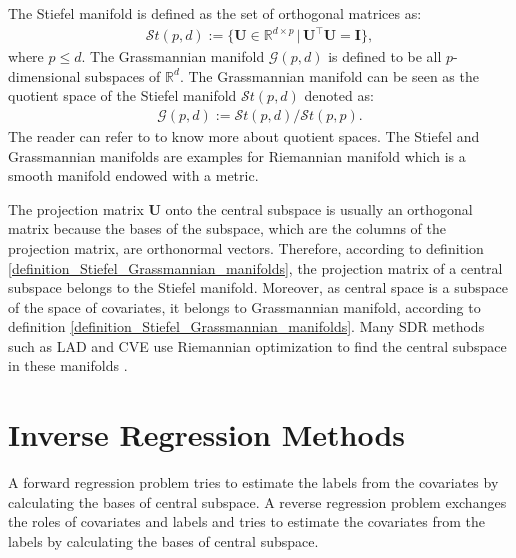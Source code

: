 \documentclass[lang=cn,10pt]{gorgeousnbook}
\numberwithin{equation}{section}%
\numberwithin{figure}{section}%
\begin{document}
\begin{definition}\label{definition_Stiefel_Grassmannian_manifolds}
The Stiefel manifold is defined as the set of orthogonal matrices as:
\begin{align}
\mathcal{S}t(p,d) := \{\boldsymbol{U} \in \mathbb{R}^{d \times p}\, |\, \boldsymbol{U}^\top \boldsymbol{U} = \boldsymbol{I}\},
\end{align}
where $p \leq d$.
The Grassmannian manifold $\mathcal{G}(p,d)$ is defined to be all $p$-dimensional subspaces of $\mathbb{R}^d$. The Grassmannian manifold can be seen as the quotient space of the Stiefel manifold $\mathcal{S}t(p,d)$ denoted as:
\begin{align}
\mathcal{G}(p,d) := \mathcal{S}t(p,d) / \mathcal{S}t(p,p).
\end{align}
The reader can refer to \cite{absil2009optimization} to know more about quotient spaces. 
The Stiefel and Grassmannian manifolds are examples for Riemannian manifold which is a smooth manifold endowed with a metric. 
\end{definition}
The projection matrix $\boldsymbol{U}$ onto the central subspace is usually an orthogonal matrix because the bases of the subspace, which are the columns of the projection matrix, are orthonormal vectors. 
Therefore, according to definition \ref{definition_Stiefel_Grassmannian_manifolds}, the projection matrix of a central subspace belongs to the Stiefel manifold. Moreover, as central space is a subspace of the space of covariates, it belongs to Grassmannian manifold, according to definition \ref{definition_Stiefel_Grassmannian_manifolds}.
Many SDR methods such as LAD \cite{cook2009likelihood} and CVE \cite{fertl2021conditional} use Riemannian optimization \cite{absil2009optimization} to find the central subspace in these manifolds \cite{cunningham2015linear}. 

\section{Inverse Regression Methods} \label{section_inverse_regression_methods}

\begin{definition}\label{definition_inverse_regression}
A forward regression problem tries to estimate the labels from the covariates by calculating the bases of central subspace. A reverse regression problem exchanges the roles of covariates and labels and tries to estimate the covariates from the labels by calculating the bases of central subspace.
\end{definition}
\end{document}

